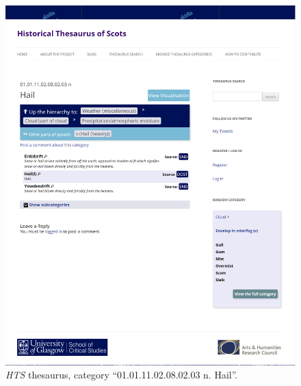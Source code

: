\begin{figure}[htbp]
  \centering
    \includegraphics[width=\linewidth]{Stolk_thes-content/fig/thes/HTS-thesaurus-hail.png}
  \caption{\textit{HTS} thesaurus, category ``01.01.11.02.08.02.03 n. Hail''.}
  \label{fig:1.A:HTS:thesaurus}
\end{figure}


